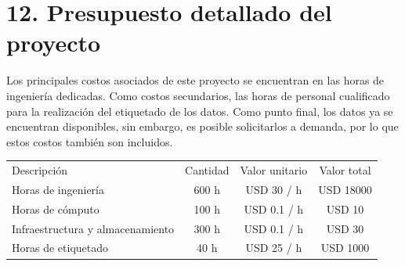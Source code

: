\documentclass[
11pt, %
]{charter}
\begin{document}
\section{12. Presupuesto detallado del proyecto}
\label{sec:presupuesto}

Los principales costos asociados de este proyecto se encuentran en las horas de ingeniería dedicadas. Como costos secundarios, las horas de personal cualificado para la realización del etiquetado de los datos. Como punto final, los datos ya se encuentran disponibles, sin embargo, es posible solicitarlos a demanda, por lo que estos costos también son incluidos.

\begin{table}[htpb]
  \centering
  \begin{tabularx}{\linewidth}{@{}|X|c|r|r|@{}}
    \hline
    \rowcolor[HTML]{C0C0C0}
    \multicolumn{4}{|c|}{\cellcolor[HTML]{C0C0C0}COSTOS DIRECTOS}   \\ \hline

    \rowcolor[HTML]{C0C0C0} Descripción                         &
    \multicolumn{1}{c|}{\cellcolor[HTML]{C0C0C0}Cantidad}       &
    \multicolumn{1}{c|}{\cellcolor[HTML]{C0C0C0}Valor unitario} &
    \multicolumn{1}{c|}{\cellcolor[HTML]{C0C0C0}Valor total}        \\ \hline

    Horas de ingeniería                                         &
    \multicolumn{1}{c|}{600 h}                                  &
    \multicolumn{1}{c|}{USD 30 / h}                             &
    \multicolumn{1}{c|}{USD 18000}                                  \\ \hline

    Horas de cómputo                                            &
    \multicolumn{1}{c|}{100 h}                                  &
    \multicolumn{1}{c|}{USD 0.1 / h}                            &
    \multicolumn{1}{c|}{USD 10}                                     \\ \hline

    Infraestructura y almacenamiento                            &
    \multicolumn{1}{c|}{300 h}                                  &
    \multicolumn{1}{c|}{USD 0.1 / h}                            &
    \multicolumn{1}{c|}{USD 30}                                     \\ \hline

    Horas de etiquetado                                         &
    \multicolumn{1}{c|}{40 h}                                   &
    \multicolumn{1}{c|}{USD 25 / h}                             &
    \multicolumn{1}{c|}{USD 1000}                                   \\ \hline


\end{tabularx}
\end{table}
\end{document}
